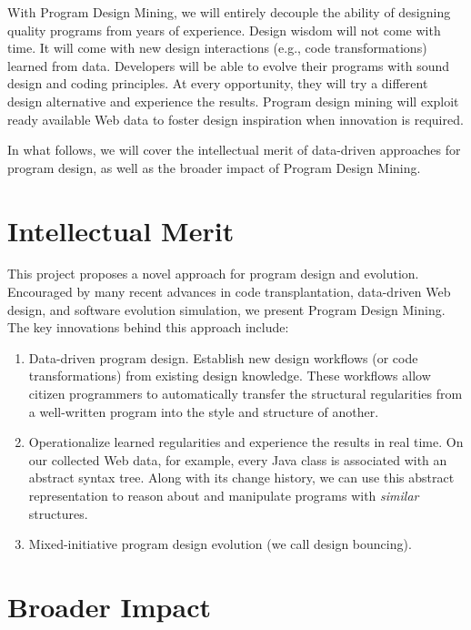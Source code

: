 With Program Design Mining, we will entirely decouple the ability of 
designing quality programs from years of experience. Design wisdom will 
not come with time. It will come with new design interactions (e.g., code transformations) learned from data. Developers will be able to evolve 
their programs with sound design and coding principles. At every 
opportunity, they will try a different design alternative and experience 
the results. Program design mining will exploit ready available Web data 
to foster design inspiration when innovation is required.

In what follows, we will cover the intellectual merit of data-driven 
approaches for program design, as well as the broader impact of Program 
Design Mining.

\section*{Intellectual Merit} %
\label{sec:merit}

This project proposes a novel approach for program design and 
evolution. Encouraged by many recent advances in code transplantation, 
data-driven Web design, and software evolution simulation, we 
present Program Design Mining. The key innovations behind this 
approach include:

\begin{enumerate}
	\item Data-driven program design. Establish new design workflows (or code 
	transformations) from existing design knowledge. These workflows allow 
	citizen programmers to automatically transfer the structural regularities 
	from a well-written program into the style and structure of another.  
	\item Operationalize learned regularities and experience the results in 
	real time. On our collected Web data, for example, every Java class is 
	associated with an abstract syntax tree. Along with its change history, 
	we can use this abstract representation to reason about and manipulate 
	programs with \textit{similar} structures.
	\item Mixed-initiative program design evolution (we call design bouncing).     
\end{enumerate}

\section*{Broader Impact} %
\label{sec:impact}

